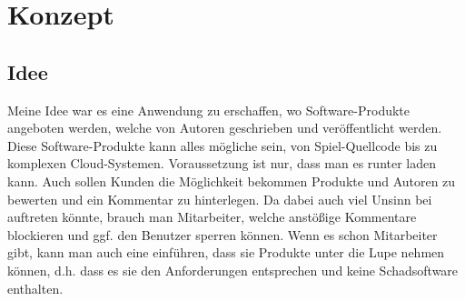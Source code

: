 \chapter{Konzept}

\section{Idee}
Meine Idee war es eine Anwendung zu erschaffen, wo Software-Produkte angeboten werden, welche von Autoren geschrieben und veröffentlicht werden. Diese Software-Produkte kann alles mögliche sein, von Spiel-Quellcode bis zu komplexen Cloud-Systemen. Voraussetzung ist nur, dass man es runter laden kann.
Auch sollen Kunden die Möglichkeit bekommen Produkte und Autoren zu bewerten und ein Kommentar zu hinterlegen. Da dabei auch viel Unsinn bei auftreten könnte, brauch man Mitarbeiter, welche anstößige Kommentare blockieren und ggf. den Benutzer sperren können. Wenn es schon Mitarbeiter gibt, kann man auch eine einführen, dass sie Produkte unter die Lupe nehmen können, d.h. dass es sie den Anforderungen entsprechen und keine Schadsoftware enthalten.

